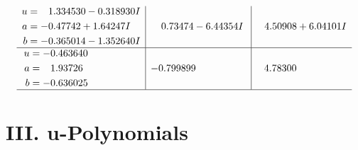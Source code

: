 \documentclass[1p]{elsarticle_modified}
\theoremstyle{definition}
\begin{document}
$$\begin{array}{c|c|c}
\begin{aligned}
u &= \phantom{-}1.334530 - 0.318930 I \\
a &= -0.47742 + 1.64247 I \\
b &= -0.365014 - 1.352640 I\end{aligned}
 & \phantom{-}0.73474 - 6.44354 I & \phantom{-}4.50908 + 6.04101 I \\ \hline\begin{aligned}
u &= -0.463640\phantom{ +0.000000I} \\
a &= \phantom{-}1.93726\phantom{ +0.000000I} \\
b &= -0.636025\phantom{ +0.000000I}\end{aligned}
 & -0.799899\phantom{ +0.000000I} & \phantom{-}4.78300\phantom{ +0.000000I}\\
 \hline 
 \end{array}$$\newpage
\newpage\renewcommand{\arraystretch}{1}
\centering \section*{ III. u-Polynomials}
\end{document}
